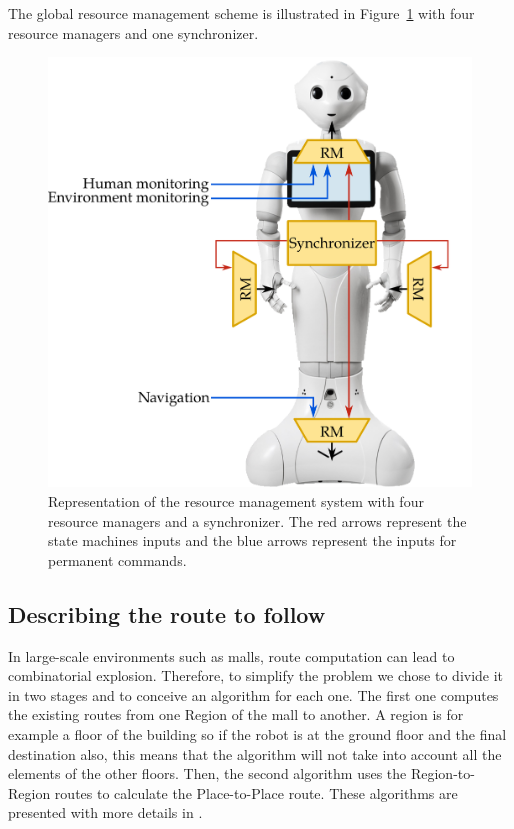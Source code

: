 \documentclass[a4paper,11pt,twoside]{StyleThese}
\begin{document}
The global resource management scheme is illustrated in Figure~\ref{fig:chap3_rm} with four resource managers and one synchronizer.

\begin{figure}[!hb]
	\centering
	\includegraphics[scale=0.26]{figures/chapter3/rm.png}
	\caption{\label{fig:chap3_rm} Representation of the resource management system with four resource managers and a synchronizer. The red arrows represent the state machines inputs and the blue arrows represent the inputs for permanent commands.}
\end{figure}

\subsection{Describing the route to follow}\label{subsec:route_description}

In large-scale environments such as malls, route computation can lead to combinatorial explosion. Therefore, to simplify the problem we chose to divide it in two stages and to conceive an algorithm for each one. The first one computes the existing routes from one Region of the mall to another. A region is for example a floor of the building so if the robot is at the ground floor and the final destination also, this means that the algorithm will not take into account all the elements of the other floors. Then, the second algorithm uses the Region-to-Region routes to calculate the Place-to-Place route. These algorithms are presented with more details in \cite{sarthou_2019_semantic}.
\end{document}
